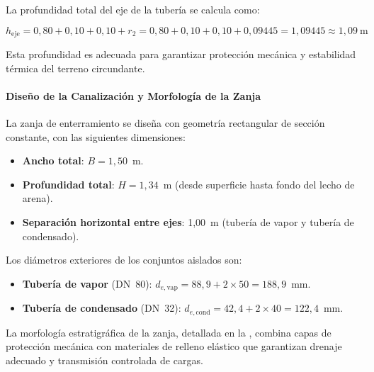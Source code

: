 La profundidad total del eje de la tubería se calcula como:

\begin{equation}
	h_{\text{eje}} = 0{,}80 + 0{,}10 + 0{,}10 + r_2 = 0{,}80 + 0{,}10 + 0{,}10 + 0{,}09445 = 1{,}09445 \approx 1{,}09~\text{m}
	\label{eq:profundidad_eje}
\end{equation}

Esta profundidad es adecuada para garantizar protección mecánica y estabilidad térmica del terreno circundante.

\paragraph{Diseño de la Canalización y Morfología de la Zanja}
\label{par:diseno_canalizacion}

La zanja de enterramiento se diseña con geometría rectangular de sección constante, con las siguientes dimensiones:

\begin{itemize}[noitemsep]
	\item \textbf{Ancho total}: $B = 1{,}50$~m.
	\item \textbf{Profundidad total}: $H = 1{,}34$~m (desde superficie hasta fondo del lecho de arena).
	\item \textbf{Separación horizontal entre ejes}: 1{,}00~m (tubería de vapor y tubería de condensado).
\end{itemize}

Los diámetros exteriores de los conjuntos aislados son:

\begin{itemize}[noitemsep]
	\item \textbf{Tubería de vapor} (DN~80): $d_{e,\text{vap}} = 88{,}9 + 2 \times 50 = 188{,}9$~mm.
	\item \textbf{Tubería de condensado} (DN~32): $d_{e,\text{cond}} = 42{,}4 + 2 \times 40 = 122{,}4$~mm.
\end{itemize}

La morfología estratigráfica de la zanja, detallada en la , combina capas de protección mecánica con materiales de relleno elástico que garantizan drenaje adecuado y transmisión controlada de cargas.


